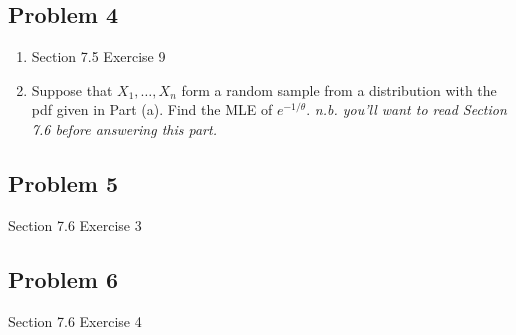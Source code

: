 \documentclass[12pt]{article}\usepackage[]{graphicx}\usepackage[]{color}
\begin{document}
\subsection*{Problem 4}

\begin{enumerate}[label=(\alph*)]
  \item Section 7.5 Exercise 9

  \item Suppose that $X_1, \ldots, X_n$ form a random sample from a distribution
  with the pdf given in Part (a). Find the MLE of $e^{-1/\theta}$. \textit{n.b.
  you'll want to read Section 7.6 before answering this part.}

\end{enumerate}


\subsection*{Problem 5}

Section 7.6 Exercise 3 \\


\subsection*{Problem 6}

Section 7.6 Exercise 4 \\
\end{document}
